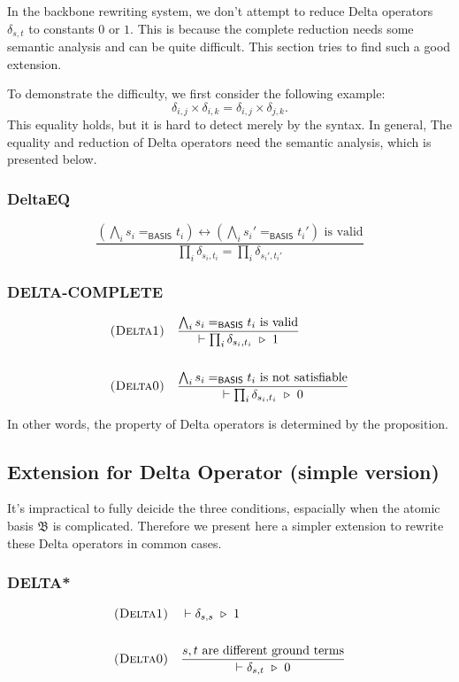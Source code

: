 In the backbone rewriting system, we don't attempt to reduce Delta operators $\delta_{s, t}$ to constants $0$ or $1$. This is because the complete reduction needs some semantic analysis and can be quite difficult. This section tries to find such a good extension.


To demonstrate the difficulty, we first consider the following example:
$$
\delta_{i, j} \times \delta_{i, k} = \delta_{i, j} \times \delta_{j, k}.
$$
This equality holds, but it is hard to detect merely by the syntax. In general, The equality and reduction of Delta operators need the semantic analysis, which is presented below.


\subsubsection*{DeltaEQ}
$$
\frac{(\bigwedge_i s_i =_\textsf{BASIS} t_i) \leftrightarrow (\bigwedge_i s_i' =_\textsf{BASIS} t_i') \textrm{ is valid}}{\prod_i \delta_{s_i, t_i} = \prod_i \delta_{s_i', t_i'}}
$$

\subsubsection*{\textsf{DELTA-COMPLETE}}

\begin{align*}
  & \textsc{(Delta1)} && 
  \frac{\bigwedge_i s_i =_\textsf{BASIS} t_i \textrm{ is valid}}{\vdash \prod_i \delta_{s_i, t_i} \ \triangleright\  1}
  \\
  \\
  & \textsc{(Delta0)} && 
  \frac{\bigwedge_i s_i =_\textsf{BASIS} t_i \textrm{ is not satisfiable}}{\vdash \prod_i \delta_{s_i, t_i} \ \triangleright\  0}
\end{align*}


In other words, the property of Delta operators is determined by the proposition.


\subsection{Extension for Delta Operator (simple version)}
It's impractical to fully deicide the three conditions, espacially when the atomic basis $\mathfrak{B}$ is complicated. Therefore we present here a simpler extension to rewrite these Delta operators in common cases.

\subsubsection*{\textsf{DELTA*}}
\begin{align*}
  & \textsc{(Delta1)} && 
  \vdash \delta_{s, s} \ \triangleright\  1
  \\
  \\
  & \textsc{(Delta0)} &&
  \frac{s, t \text{ are different ground terms}}{\vdash \delta_{s, t} \ \triangleright\  0}
\end{align*}

